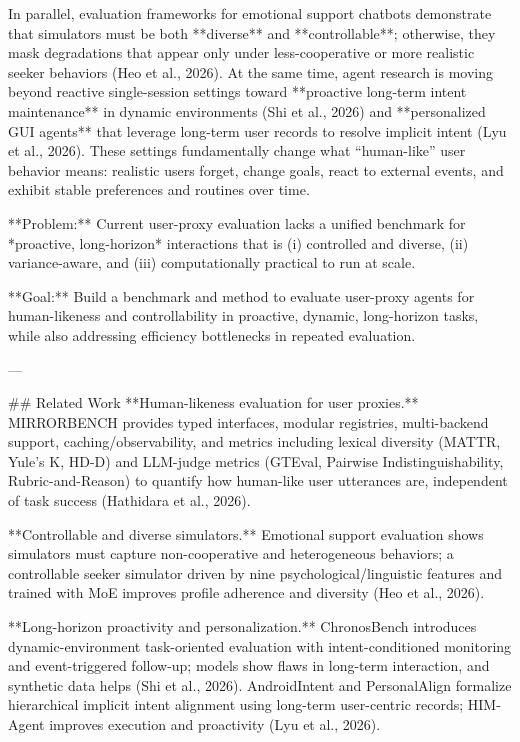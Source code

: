 In parallel, evaluation frameworks for emotional support chatbots demonstrate that simulators must be both **diverse** and **controllable**; otherwise, they mask degradations that appear only under less-cooperative or more realistic seeker behaviors (Heo et al., 2026). At the same time, agent research is moving beyond reactive single-session settings toward **proactive long-term intent maintenance** in dynamic environments (Shi et al., 2026) and **personalized GUI agents** that leverage long-term user records to resolve implicit intent (Lyu et al., 2026). These settings fundamentally change what “human-like” user behavior means: realistic users forget, change goals, react to external events, and exhibit stable preferences and routines over time.

**Problem:** Current user-proxy evaluation lacks a unified benchmark for *proactive, long-horizon* interactions that is (i) controlled and diverse, (ii) variance-aware, and (iii) computationally practical to run at scale.

**Goal:** Build a benchmark and method to evaluate user-proxy agents for human-likeness and controllability in proactive, dynamic, long-horizon tasks, while also addressing efficiency bottlenecks in repeated evaluation.

---

## Related Work  
**Human-likeness evaluation for user proxies.** MIRRORBENCH provides typed interfaces, modular registries, multi-backend support, caching/observability, and metrics including lexical diversity (MATTR, Yule’s K, HD-D) and LLM-judge metrics (GTEval, Pairwise Indistinguishability, Rubric-and-Reason) to quantify how human-like user utterances are, independent of task success (Hathidara et al., 2026).  

**Controllable and diverse simulators.** Emotional support evaluation shows simulators must capture non-cooperative and heterogeneous behaviors; a controllable seeker simulator driven by nine psychological/linguistic features and trained with MoE improves profile adherence and diversity (Heo et al., 2026).  

**Long-horizon proactivity and personalization.** ChronosBench introduces dynamic-environment task-oriented evaluation with intent-conditioned monitoring and event-triggered follow-up; models show flaws in long-term interaction, and synthetic data helps (Shi et al., 2026). AndroidIntent and PersonalAlign formalize hierarchical implicit intent alignment using long-term user-centric records; HIM-Agent improves execution and proactivity (Lyu et al., 2026).  

